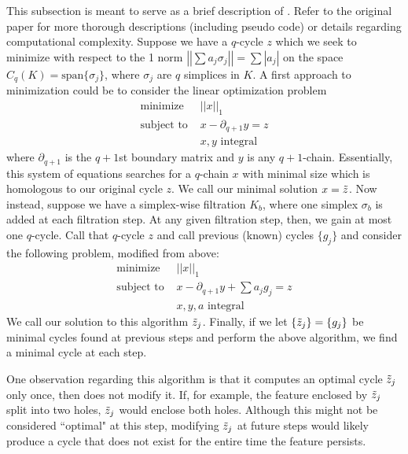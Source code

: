 This subsection is meant to serve as a brief description of \cite{Escolar2016}. Refer to the original paper for more thorough descriptions (including pseudo code) or details regarding computational complexity. Suppose we have a $q$-cycle $z$ which we seek to minimize with respect to the 1 norm $\left|\left| \sum a_j\sigma_j \right|\right| = \sum |a_j|$ on the space $C_q(K) = \text{span}\{\sigma_j\}$, where $\sigma_j$ are $q$ simplices in $K$. A first approach to minimization could be to consider the linear optimization problem
\begin{align*}
    \text{minimize } & ||x||_1\\
    \text{subject to } & x - \partial_{q+1}y = z\\
    & x, y \text{ integral}
\end{align*}
where $\partial_{q+1}$ is the $q+1$st boundary matrix and $y$ is any $q+1$-chain. Essentially, this system of equations searches for a $q$-chain $x$ with minimal size which is homologous to our original cycle $z$. We call our minimal solution $x = \Tilde{z}$. Now instead, suppose we have a simplex-wise filtration $K_b$, where one simplex $\sigma_b$ is added at each filtration step. At any given filtration step, then, we gain at most one $q$-cycle. Call that $q$-cycle $z$ and call previous (known) cycles $\{g_j\}$ and consider the following problem, modified from above:
\begin{align*}
    \text{minimize } & ||x||_1\\
    \text{subject to } & x - \partial_{q + 1}y + \sum a_j g_j = z\\
    & x,y,a \text{ integral}
\end{align*}
We call our solution to this algorithm $\Tilde{z}_j$. Finally, if we let $\{\Tilde{z}_j\} = \{g_j\}$ be minimal cycles found at previous steps and perform the above algorithm, we find a minimal cycle at each step.

One observation regarding this algorithm is that it computes an optimal cycle $\Tilde{z}_j$ only once, then does not modify it. If, for example, the feature enclosed by $\Tilde{z}_j$ split into two holes, $\Tilde{z}_j$ would enclose both holes. Although this might not be considered ``optimal" at this step, modifying $\Tilde{z}_j$ at future steps would likely produce a cycle that does not exist for the entire time the feature persists.


